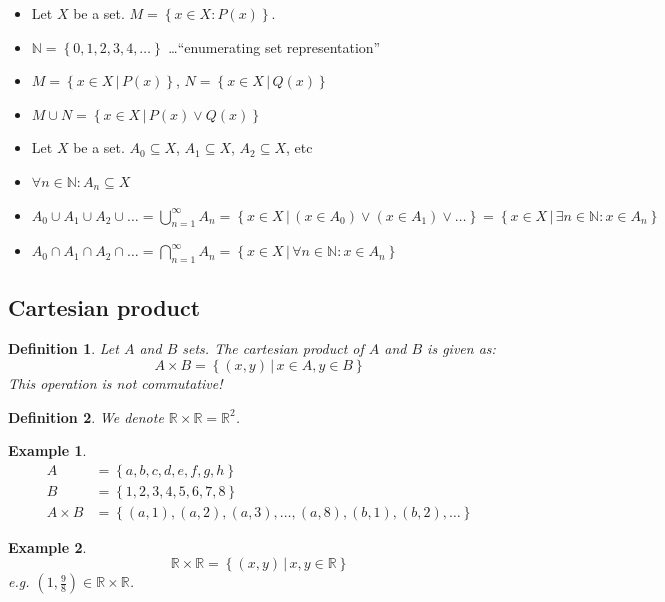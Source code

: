 \documentclass[a4paper,landscape,twocolumn]{article}
\newtheorem{defi}{Definition}
\newtheorem{ex}{Example}
\newcommand\set[1]{\left\{#1\right\}}
\newcommand\setdef[2]{\left\{#1\,|\,#2\right\}}
\begin{document}
\begin{itemize}
  \item Let $X$ be a set. $M = \set{x \in X: P(x)}$.
  \item $\mathbb N = \set{0,1,2,3,4, \dots}$ \dots \enquote{enumerating set representation}
  \item $M = \setdef{x \in X}{P(x)}$, $N = \setdef{x \in X}{Q(x)}$
  \item $M \cup N = \setdef{x \in X}{P(x) \lor Q(x)}$
  \item Let $X$ be a set. $A_0 \subseteq X$, $A_1 \subseteq X$, $A_2 \subseteq X$, etc
  \item $\forall n \in \mathbb N: A_n \subseteq X$
  \item $A_0 \cup A_1 \cup A_2 \cup \dots = \bigcup_{n=1}^\infty A_{n} = \setdef{x \in X}{(x \in A_0) \lor (x \in A_1) \lor \dots} = \setdef{x \in X}{\exists n \in \mathbb N: x \in A_n}$
  \item $A_0 \cap A_1 \cap A_2 \cap \dots = \bigcap_{n=1}^\infty A_n = \setdef{x \in X}{\forall n \in \mathbb N: x \in A_n}$
\end{itemize}

\subsection{Cartesian product}
\begin{defi}
  Let $A$ and $B$ sets. The \emph{cartesian product of $A$ and $B$} is given as:
  \[ A \times B = \setdef{(x, y)}{x \in A, y \in B} \]
  This operation is not commutative!
\end{defi}

\begin{defi}
  We denote $\mathbb R \times \mathbb R = \mathbb R^2$.
\end{defi}

\begin{ex}
  \begin{align*}
    A &= \set{a, b, c, d, e, f, g, h} \\
    B &= \set{1, 2, 3, 4, 5, 6, 7, 8} \\
    A \times B &= \set{(a, 1), (a, 2), (a, 3), \dots, (a, 8), (b, 1), (b, 2), \dots}
  \end{align*}
\end{ex}

\begin{ex}
  \[ \mathbb R \times \mathbb R = \setdef{(x, y)}{x, y \in \mathbb R} \]
  e.g. $(1, \frac98) \in \mathbb R \times \mathbb R$.
\end{ex}
\end{document}
